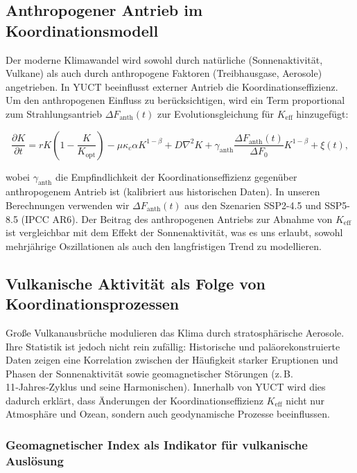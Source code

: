 \documentclass[12pt,a4paper]{article}
\newcommand{\Keff}{K_{\mathrm{eff}}}
\begin{document}
	\subsection{Anthropogener Antrieb im Koordinationsmodell}
	
	Der moderne Klimawandel wird sowohl durch natürliche (Sonnenaktivität, Vulkane) als auch durch anthropogene Faktoren (Treibhausgase, Aerosole) angetrieben. In YUCT beeinflusst externer Antrieb die Koordinationseffizienz. Um den anthropogenen Einfluss zu berücksichtigen, wird ein Term proportional zum Strahlungsantrieb \(\Delta F_{\mathrm{anth}}(t)\) zur Evolutionsgleichung für \(K_{\mathrm{eff}}\) hinzugefügt:
	
	\[
	\frac{\partial K}{\partial t} = r K \left(1 - \frac{K}{K_{\mathrm{opt}}}\right) - \mu \kappa_c \alpha K^{1-\beta} 
	+ D\nabla^2 K + \gamma_{\mathrm{anth}} \frac{\Delta F_{\mathrm{anth}}(t)}{\Delta F_0} K^{1-\beta} + \xi(t),
	\]
	
	wobei \(\gamma_{\mathrm{anth}}\) die Empfindlichkeit der Koordinationseffizienz gegenüber anthropogenem Antrieb ist (kalibriert aus historischen Daten). In unseren Berechnungen verwenden wir \(\Delta F_{\mathrm{anth}}(t)\) aus den Szenarien SSP2-4.5 und SSP5-8.5 (IPCC AR6). Der Beitrag des anthropogenen Antriebs zur Abnahme von \(K_{\mathrm{eff}}\) ist vergleichbar mit dem Effekt der Sonnenaktivität, was es uns erlaubt, sowohl mehrjährige Oszillationen als auch den langfristigen Trend zu modellieren.
	
	\subsection{Vulkanische Aktivität als Folge von Koordinationsprozessen}
	
	Große Vulkanausbrüche modulieren das Klima durch stratosphärische Aerosole. Ihre Statistik ist jedoch nicht rein zufällig: Historische und paläorekonstruierte Daten zeigen eine Korrelation zwischen der Häufigkeit starker Eruptionen und Phasen der Sonnenaktivität sowie geomagnetischer Störungen (z. B. 11‑Jahres‑Zyklus und seine Harmonischen). Innerhalb von YUCT wird dies dadurch erklärt, dass Änderungen der Koordinationseffizienz \(\Keff\) nicht nur Atmosphäre und Ozean, sondern auch geodynamische Prozesse beeinflussen.
	
	\subsubsection{Geomagnetischer Index als Indikator für vulkanische Auslösung}
	
\end{document}
